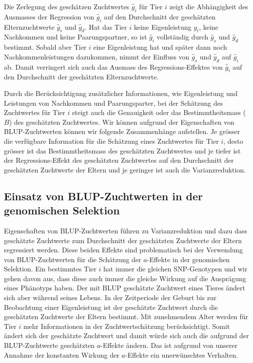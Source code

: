 \documentclass[]{book}
\begin{document}
Die Zerlegung des geschätzen Zuchtwertes \(\hat{g}_i\) für Tier \(i\)
zeigt die Abhängigkeit des Ausmasses der Regression von \(\hat{g}_i\)
auf den Durchschnitt der geschätzten Elternzuchtwerte \(\hat{g}_s\) und
\(\hat{g}_d\). Hat das Tier \(i\) keine Eigenleistung \(y_i\), keine
Nachkommen und keine Paarungspartner, so ist \(\hat{g}_i\) vollständig
durch \(\hat{g}_s\) und \(\hat{g}_d\) bestimmt. Sobald aber Tier \(i\)
eine Eigenleistung hat und später dann noch Nachkommenleistungen
dazukommen, nimmt der Einfluss von \(\hat{g}_s\) und \(\hat{g}_d\) auf
\(\hat{g}_i\) ab. Damit verringert sich auch das Ausmass des
Regressions-Effektes von \(\hat{g}_i\) auf den Durchschnitt der
geschätzten Elternzuchtwerte.

Durch die Berücksichtigung zusätzlicher Informationen, wie Eigenleistung
und Leistungen von Nachkommen und Paarungsparter, bei der Schätzung des
Zuchtwertes für Tier \(i\) steigt auch die Genauigkeit oder das
Bestimmtheitsmass (\(B\)) des geschätzten Zuchtwertes. Wir können
aufgrund der Eigenschaften von BLUP-Zuchtwerten können wir folgende
Zusammenhänge aufstellen. Je grösser die verfügbare Information für die
Schätzung eines Zuchtwertes für Tier \(i\), desto grösser ist das
Bestimmtheitsmass des geschätzten Zuchtwertes und je tiefer ist der
Regressions-Effekt des geschätzten Zuchtwertes auf den Durchschnitt der
geschätzten Zuchtwerte der Eltern und je geringer ist auch die
Varianzreduktion.

\subsection{Einsatz von BLUP-Zuchtwerten in der genomischen
Selektion}\label{einsatz-von-blup-zuchtwerten-in-der-genomischen-selektion}

Eigenschaften von BLUP-Zuchtwerten führen zu Varianzreduktion und dazu
dass geschätzte Zuchtwerte zum Durchschnitt der geschätzten Zuchtwerte
der Eltern regressiert werden. Diese beiden Effekte sind problematisch
bei der Verwendung von BLUP-Zuchtwerten für die Schätzung der
\(a\)-Effekte in der genomischen Selektion. Ein bestimmtes Tier \(i\)
hat immer die gleichen SNP-Genotypen und wir gehen davon aus, dass diese
auch immer die gleiche Wirkung auf die Ausprägung eines Phänotyps haben.
Der mit BLUP geschätzte Zuchtwert eines Tieres ändert sich aber während
seines Lebens. In der Zeitperiode der Geburt bis zur Beobachtung einer
Eigenleistung ist der geschätzte Zuchtwert durch die geschätzten
Zuchtwerte der Eltern bestimmt. Mit zunehmendem Alter werden für Tier
\(i\) mehr Informationen in der Zuchtwertschätzung berücksichtigt. Somit
ändert sich der geschätzte Zuchtwert und damit würde sich auch die
aufgrund der BLUP-Zuchtwerte geschätzten \(a\)-Effekte ändern. Das ist
aufgrund von unserer Annahme der konstanten Wirkung der \(a\)-Effekte
ein unerwünschtes Verhalten.
\end{document}
